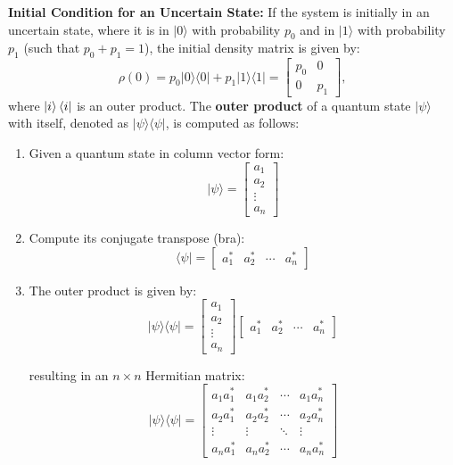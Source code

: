 \documentclass[11pt]{article}
\begin{document}
\textbf{Initial Condition for an Uncertain State:} If the system is initially in an uncertain state, where it is in $|0\rangle$ with probability $p_0$ and in $|1\rangle$ with probability $p_1$ (such that $p_0 + p_1 = 1$), the initial density matrix is given by:
\begin{equation*}
    \rho(0) = p_0 |0\rangle \langle 0| + p_1 |1\rangle \langle 1| = \begin{bmatrix} p_0 & 0 \\ 0 & p_1 \end{bmatrix},
\end{equation*}
where $\ket{i}\bra{i}$ is an outer product. The \textbf{outer product} of a quantum state \( |\psi\rangle \) with itself, denoted as \( |\psi\rangle \langle \psi| \), is computed as follows:

\begin{enumerate}
\item Given a quantum state in column vector form:
   \[
   |\psi\rangle = \begin{bmatrix} a_1 \\ a_2 \\ \vdots \\ a_n \end{bmatrix}
   \]

\item Compute its conjugate transpose (bra):
   \[
   \langle \psi| = \begin{bmatrix} a_1^* & a_2^* & \cdots & a_n^* \end{bmatrix}
   \]

\item The outer product is given by:
   \[
   |\psi\rangle \langle \psi| =
   \begin{bmatrix} a_1 \\ a_2 \\ \vdots \\ a_n \end{bmatrix}
   \begin{bmatrix} a_1^* & a_2^* & \cdots & a_n^* \end{bmatrix}
   \]

   resulting in an \( n \times n \) Hermitian matrix:
   \[
   |\psi\rangle \langle \psi| =
   \begin{bmatrix}
   a_1 a_1^* & a_1 a_2^* & \cdots & a_1 a_n^* \\
   a_2 a_1^* & a_2 a_2^* & \cdots & a_2 a_n^* \\
   \vdots & \vdots & \ddots & \vdots \\
   a_n a_1^* & a_n a_2^* & \cdots & a_n a_n^*
   \end{bmatrix}
   \]
\end{enumerate}
\end{document}
